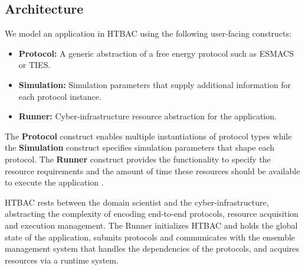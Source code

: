\subsection{Architecture}


We model an application in HTBAC using the following user-facing constructs:


\begin{itemize}
  \item \textbf{Protocol:} A generic abstraction of a free energy protocol
  such as ESMACS or TIES.
  \item \textbf{Simulation:} Simulation parameters that supply additional
  information for each protocol instance.
  \item \textbf{Runner:} Cyber-infrastructure resource abstraction for the
  application.
\end{itemize}


The \textbf{Protocol} construct enables multiple instantiations of protocol
types while the \textbf{Simulation} construct specifies simulation parameters
that shape each protocol. The \textbf{Runner} construct provides the
functionality to specify the resource requirements and the amount of time
these resources should be available to execute the application .



HTBAC rests between the domain scientist and the cyber-infrastructure,
abstracting the complexity of encoding end-to-end protocols, resource
acquisition and execution management. The Runner initializes HTBAC and holds
the global state of the application, submits protocols and communicates with
the ensemble management system that handles the dependencies of the
protocols, and acquires resources via a runtime system.

